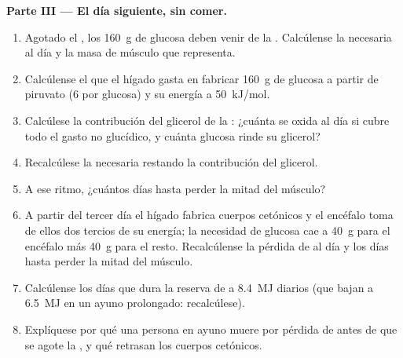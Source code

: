 \begin{problem}
\medskip
\noindent\textbf{Parte III --- El día siguiente, sin comer.}
\begin{enumerate}[resume]
  \item Agotado el , los \qty{160}{g} de glucosa deben venir de la
        . Calcúlense la  necesaria al día y la masa
        de músculo que representa.
  \item Calcúlense el  que el hígado gasta en fabricar \qty{160}{g} de
        glucosa a partir de piruvato (6  por glucosa) y su energía a
        \qty{50}{kJ/mol}.
  \item Calcúlese la contribución del glicerol de la : ¿cuánta 
        se oxida al día si cubre todo el gasto no glucídico, y cuánta
        glucosa rinde su glicerol?
  \item Recalcúlese la  necesaria restando la contribución del
        glicerol.
  \item A ese ritmo, ¿cuántos días hasta perder la mitad del músculo?
  \item A partir del tercer día el hígado fabrica cuerpos cetónicos y el
        encéfalo toma de ellos dos tercios de su energía; la necesidad de
        glucosa cae a \qty{40}{g} para el encéfalo más \qty{40}{g} para el
        resto. Recalcúlense la pérdida de  al día y los días hasta
        perder la mitad del músculo.
  \item Calcúlense los días que dura la reserva de  a \qty{8.4}{MJ}
        diarios (que bajan a \qty{6.5}{MJ} en un ayuno prolongado:
        recalcúlese).
  \item Explíquese por qué una persona en ayuno muere por pérdida de
         antes de que se agote la , y qué retrasan los cuerpos
        cetónicos.
\end{enumerate}


\end{problem}

